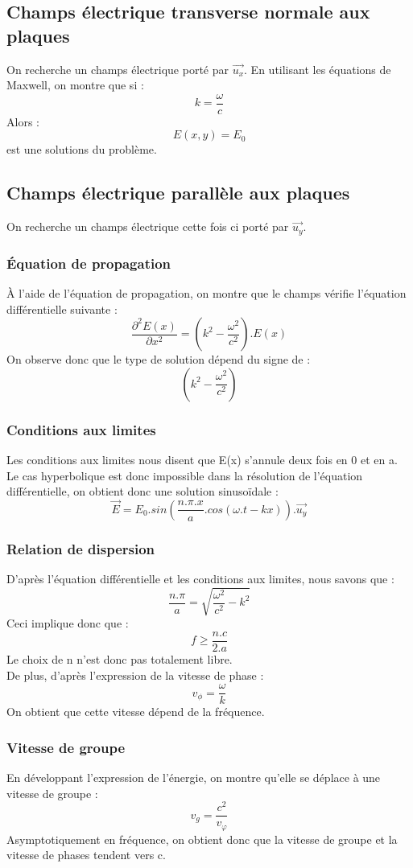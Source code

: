 \subsection{Champs électrique transverse normale aux plaques}
On recherche un champs électrique porté par $\overrightarrow{u_x}$. En utilisant les équations de Maxwell, on montre que si : 
$$k = \dfrac{\omega}{c}$$
Alors :
$$E(x,y) = E_0$$
est une solutions du problème.
\subsection{Champs électrique parallèle aux plaques}
On recherche un champs électrique cette fois ci porté par $\overrightarrow{u_y}$. 
\subsubsection{Équation de propagation}
À l'aide de l'équation de propagation, on montre que le champs vérifie l'équation différentielle suivante :
$$\dfrac{\partial^2 E(x)}{\partial x^2} = (k^2 - \dfrac{\omega^2}{c^2}).E(x)$$
On observe donc que le type de solution dépend du signe de : 
$$(k^2 - \dfrac{\omega^2}{c^2})$$
\subsubsection{Conditions aux limites}
Les conditions aux limites nous disent que E(x) s'annule deux fois en 0 et en a. Le cas hyperbolique est donc impossible dans la résolution de l'équation différentielle, on obtient donc une solution sinusoïdale : 
$$\overrightarrow{E} = E_0.sin(\dfrac{n.\pi.x}{a}.cos(\omega.t - kx)).\overrightarrow{u_y}$$
\subsubsection{Relation de dispersion}
D'après l'équation différentielle et les conditions aux limites, nous savons que : 
$$\dfrac{n.\pi}{a} = \sqrt{\dfrac{\omega^2}{c^2} - k^2}$$
Ceci implique donc que : 
$$f \geq \dfrac{n.c}{2.a}$$
Le choix de n n'est donc pas totalement libre.\\
De plus, d'après l'expression de la vitesse de phase : 
$$v_{\phi} = \dfrac{\omega}{k}$$
On obtient que cette vitesse dépend de la fréquence.
\subsubsection{Vitesse de groupe}
En développant l'expression de l'énergie, on montre qu'elle se déplace à une vitesse de groupe : 
$$v_g = \dfrac{c^2}{v_{\varphi}}$$
Asymptotiquement en fréquence, on obtient donc que la vitesse de groupe et la vitesse de phases tendent vers c.
